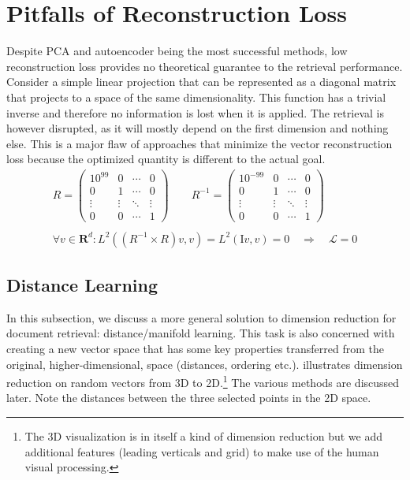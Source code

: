 \section{Pitfalls of Reconstruction Loss} \label{sec:reconstruction_loss}

Despite PCA and autoencoder being the most successful methods, low reconstruction loss provides no theoretical guarantee to the retrieval performance.
Consider a simple linear projection that can be represented as a diagonal matrix that projects to a space of the same dimensionality.
This function has a trivial inverse and therefore no information is lost when it is applied.
The retrieval is however disrupted, as it will mostly depend on the first dimension and nothing else.
This is a major flaw of approaches that minimize the vector reconstruction loss because the optimized quantity is different to the actual goal.
\begin{gather*}
    R = \begin{pmatrix}
    10^{99} & 0 & {\cdots} & 0 \\
    0 & 1 & {\cdots} & 0 \\
    {\vdots}  & {\vdots}  & {\ddots} & {\vdots}  \\
    0 & 0 & {\cdots} & 1
    \end{pmatrix}
    \qquad
    R^{-1} = \begin{pmatrix}
    10^{-99} & 0 & {\cdots} & 0 \\
    0 & 1 & {\cdots} & 0 \\
    {\vdots}  & {\vdots}  & {\ddots} & {\vdots}  \\
    0 & 0 & {\cdots} & 1
    \end{pmatrix} \\ \\
    \forall v \in \mathbf{R}^d: L^2((R^{-1}\times R)v, v) = L^2(\text{I}v, v) = 0 \quad\Rightarrow\quad \mathcal{L} = 0
\end{gather*}

\subsection{Distance Learning}

In this subsection, we discuss a more general solution to dimension reduction for document retrieval: distance/manifold learning.
This task is also concerned with creating a new vector space that has some key properties transferred from the original, higher-dimensional, space (distances, ordering etc.).
 illustrates dimension reduction on random vectors from 3D to 2D.\footnote{The 3D visualization is in itself a kind of dimension reduction but we add additional features (leading verticals and grid) to make use of the human visual processing.}
The various methods are discussed later.
Note the distances between the three selected points in the 2D space.

